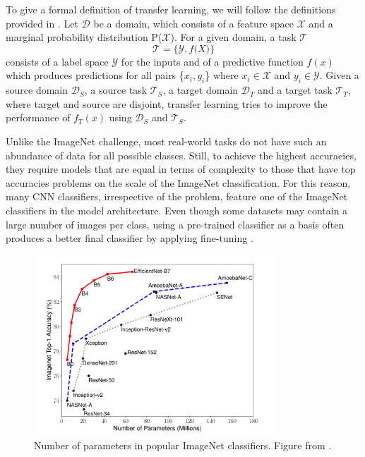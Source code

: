To give a formal definition of transfer learning, we will follow the definitions provided in \citep{transferSurvey2010}. 
Let $\mathcal{D}$ be a domain, which consists of a feature space $\mathcal{X}$ and a marginal probability distribution P($\mathcal{X}$). 
For a given domain, a task $\mathcal{T}$ \[\mathcal{T} = \{\mathcal{Y}, f\mathcal(X)\}\] \noindent consists of a label space $\mathcal{Y}$ for the inputs and of a predictive function $f(x)$ which produces predictions for all pairs \{$x_i, y_i$\} where $x_i \in \mathcal{X}$ and $y_i \in \mathcal{Y}$. 
Given a source domain $\mathcal{D}_S$, a source task $\mathcal{T}_S$, a target domain $\mathcal{D}_T$ and a target task $\mathcal{T}_T$, where target and source are disjoint, transfer learning tries to improve the performance of $f_T(x)$ using $\mathcal{D}_S$ and $\mathcal{T}_S$.

Unlike the ImageNet challenge, most real-world tasks do not have such an abundance of data for all possible classes. Still, to achieve the highest accuracies, they require models that are equal in terms of complexity to those that have top accuracies problems on the scale of the ImageNet classification. For this reason, many CNN classifiers, irrespective of the problem, feature one of the ImageNet classifiers in the model architecture. Even though some datasets may contain a large number of images per class, using a pre-trained classifier as a basis often produces a better final classifier by applying fine-tuning \citep{betterTransfer}.

\begin{figure}[h!] 
\centering 
\includegraphics[width=0.8\textwidth]{imgs/imagenet_parameters.png}
\caption{Number of parameters in popular ImageNet classifiers. Figure from \citep{efficientNet}.\label{fig:params}}
\end{figure}

